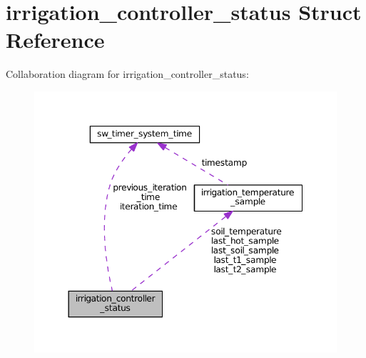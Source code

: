 \hypertarget{structirrigation__controller__status}{}\section{irrigation\+\_\+controller\+\_\+status Struct Reference}
\label{structirrigation__controller__status}


Collaboration diagram for irrigation\+\_\+controller\+\_\+status\+:\nopagebreak
\begin{figure}[H]
\begin{center}
\leavevmode
\includegraphics[width=350pt]{structirrigation__controller__status__coll__graph}
\end{center}
\end{figure}

